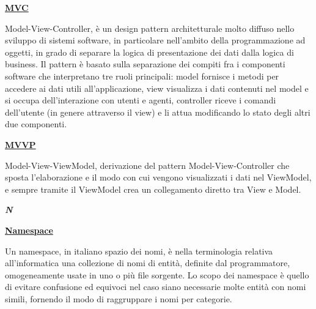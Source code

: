 \bigskip
\begin{addmargin}[0em]{0em}	
	\textbf{\underline{MVC}} 
\end{addmargin}

\medskip
\begin{addmargin}[5em]{1em}	
Model-View-Controller, è un design pattern architetturale molto diffuso nello sviluppo di sistemi software, in particolare nell'ambito della programmazione ad oggetti, in grado di separare la logica di presentazione dei dati dalla logica di business. Il pattern è basato sulla separazione dei compiti fra i componenti software che interpretano tre ruoli principali: model fornisce i metodi per accedere ai dati utili all'applicazione, view visualizza i dati contenuti nel model e si occupa dell'interazione con utenti e agenti, controller riceve i comandi dell'utente (in genere attraverso il view) e li attua modificando lo stato degli altri due componenti.
\end{addmargin}	

\bigskip
\begin{addmargin}[0em]{0em}	
	\textbf{\underline{MVVP}} 
\end{addmargin}

\medskip
\begin{addmargin}[5em]{1em}
Model-View-ViewModel, derivazione del pattern Model-View-Controller che sposta l'elaborazione e il modo con cui vengono visualizzati i dati nel ViewModel, e sempre tramite il ViewModel crea un collegamento diretto tra View e Model.
\end{addmargin}	

\newpage

\cleardoublepage
{}
{}
\noindent\hrulefill\hspace{4mm}\textbf{\textsl{\Huge{N}}}\hspace{4mm}\hrulefill

\vspace*{2\bigskipamount}

\begin{addmargin}[0em]{0em}	
	\textbf{\underline{Namespace}} 
\end{addmargin}

\medskip
\begin{addmargin}[5em]{1em}
	Un namespace, in italiano spazio dei nomi, è nella terminologia relativa all'informatica una collezione di nomi di entità, definite dal programmatore, omogeneamente usate in uno o più file sorgente. Lo scopo dei namespace è quello di evitare confusione ed equivoci nel caso siano necessarie molte entità con nomi simili, fornendo il modo di raggruppare i nomi per categorie.
\end{addmargin}	

